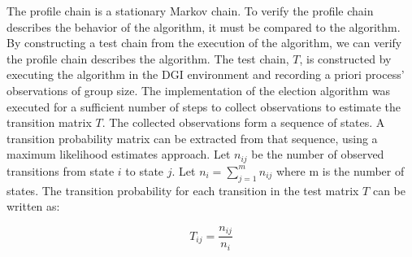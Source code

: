 
The profile chain is a stationary Markov chain.
To verify the profile chain describes the behavior of the algorithm, it must be compared to the algorithm.
By constructing a test chain from the execution of the algorithm, we can verify the profile chain describes the algorithm.
The test chain, $T$, is constructed by executing the algorithm in the DGI environment and recording a priori process' observations of group size.
The implementation of the election algorithm was executed for a sufficient number of steps to collect observations to estimate the transition matrix $T$.
The collected observations form a sequence of states.
A transition probability matrix can be extracted from that sequence, using a maximum likelihood estimates approach.
Let $n_{ij}$ be the number of observed transitions from state $i$ to state $j$. Let $n_{i}=\sum_{j=1}^{m} n_{ij}$ where m is the number of states.
The transition probability for each transition in the test matrix $T$ can be written as:

\[ T_{ij} = \frac{n_{ij}}{n_{i}} \]

